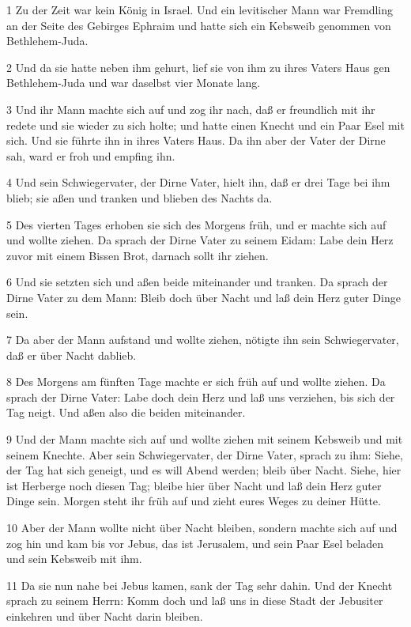 \par 1 Zu der Zeit war kein König in Israel. Und ein levitischer Mann war Fremdling an der Seite des Gebirges Ephraim und hatte sich ein Kebsweib genommen von Bethlehem-Juda.
\par 2 Und da sie hatte neben ihm gehurt, lief sie von ihm zu ihres Vaters Haus gen Bethlehem-Juda und war daselbst vier Monate lang.
\par 3 Und ihr Mann machte sich auf und zog ihr nach, daß er freundlich mit ihr redete und sie wieder zu sich holte; und hatte einen Knecht und ein Paar Esel mit sich. Und sie führte ihn in ihres Vaters Haus. Da ihn aber der Vater der Dirne sah, ward er froh und empfing ihn.
\par 4 Und sein Schwiegervater, der Dirne Vater, hielt ihn, daß er drei Tage bei ihm blieb; sie aßen und tranken und blieben des Nachts da.
\par 5 Des vierten Tages erhoben sie sich des Morgens früh, und er machte sich auf und wollte ziehen. Da sprach der Dirne Vater zu seinem Eidam: Labe dein Herz zuvor mit einem Bissen Brot, darnach sollt ihr ziehen.
\par 6 Und sie setzten sich und aßen beide miteinander und tranken. Da sprach der Dirne Vater zu dem Mann: Bleib doch über Nacht und laß dein Herz guter Dinge sein.
\par 7 Da aber der Mann aufstand und wollte ziehen, nötigte ihn sein Schwiegervater, daß er über Nacht dablieb.
\par 8 Des Morgens am fünften Tage machte er sich früh auf und wollte ziehen. Da sprach der Dirne Vater: Labe doch dein Herz und laß uns verziehen, bis sich der Tag neigt. Und aßen also die beiden miteinander.
\par 9 Und der Mann machte sich auf und wollte ziehen mit seinem Kebsweib und mit seinem Knechte. Aber sein Schwiegervater, der Dirne Vater, sprach zu ihm: Siehe, der Tag hat sich geneigt, und es will Abend werden; bleib über Nacht. Siehe, hier ist Herberge noch diesen Tag; bleibe hier über Nacht und laß dein Herz guter Dinge sein. Morgen steht ihr früh auf und zieht eures Weges zu deiner Hütte.
\par 10 Aber der Mann wollte nicht über Nacht bleiben, sondern machte sich auf und zog hin und kam bis vor Jebus, das ist Jerusalem, und sein Paar Esel beladen und sein Kebsweib mit ihm.
\par 11 Da sie nun nahe bei Jebus kamen, sank der Tag sehr dahin. Und der Knecht sprach zu seinem Herrn: Komm doch und laß uns in diese Stadt der Jebusiter einkehren und über Nacht darin bleiben.
